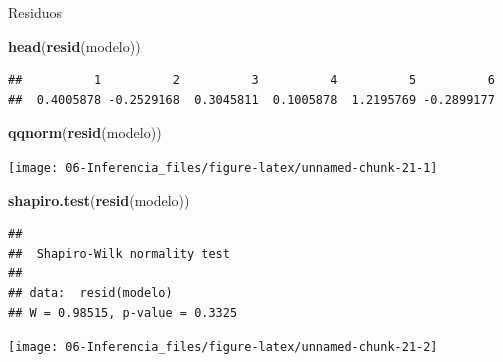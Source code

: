 \documentclass[]{book}
\newenvironment{Shaded}{\begin{snugshade}}{\end{snugshade}}
\newcommand{\KeywordTok}[1]{\textcolor[rgb]{0.13,0.29,0.53}{\textbf{#1}}}
\newcommand{\CommentTok}[1]{\textcolor[rgb]{0.56,0.35,0.01}{\textit{#1}}}
\newcommand{\OperatorTok}[1]{\textcolor[rgb]{0.81,0.36,0.00}{\textbf{#1}}}
\newcommand{\NormalTok}[1]{#1}
\begin{document}
Residuos

\begin{Shaded}
\begin{Highlighting}[]
\KeywordTok{head}\NormalTok{(}\KeywordTok{resid}\NormalTok{(modelo))}
\end{Highlighting}
\end{Shaded}

\begin{verbatim}
##          1          2          3          4          5          6 
##  0.4005878 -0.2529168  0.3045811  0.1005878  1.2195769 -0.2899177
\end{verbatim}

\begin{Shaded}
\begin{Highlighting}[]
\KeywordTok{qqnorm}\NormalTok{(}\KeywordTok{resid}\NormalTok{(modelo))}
\end{Highlighting}
\end{Shaded}

\begin{center}\texttt{[image: 06-Inferencia\_files/figure-latex/unnamed-chunk-21-1]} \end{center}

\begin{Shaded}
\begin{Highlighting}[]
\KeywordTok{shapiro.test}\NormalTok{(}\KeywordTok{resid}\NormalTok{(modelo))}
\end{Highlighting}
\end{Shaded}

\begin{verbatim}
## 
##  Shapiro-Wilk normality test
## 
## data:  resid(modelo)
## W = 0.98515, p-value = 0.3325
\end{verbatim}

\begin{Shaded}
\end{Shaded}

\begin{center}\texttt{[image: 06-Inferencia\_files/figure-latex/unnamed-chunk-21-2]} \end{center}
\end{document}
